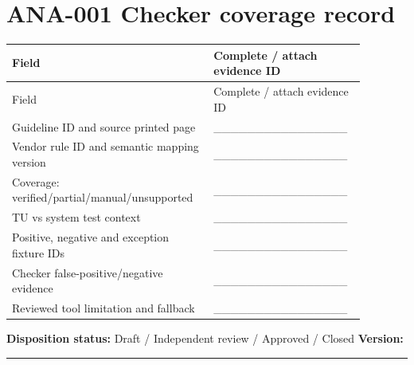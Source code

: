 \documentclass[10pt,letterpaper]{article}
\begin{document}
\section{ANA-001 Checker coverage record}
\small\setlength{\tabcolsep}{3pt}\renewcommand{\arraystretch}{1.15}
\begin{longtable}{p{0.52\linewidth}p{0.36\linewidth}}
\toprule
Field & Complete / attach evidence ID\\ \midrule
\endfirsthead
\toprule
Field & Complete / attach evidence ID\\ \midrule
\endhead
Guideline ID and source printed page & \_\_\_\_\_\_\_\_\_\_\_\_\_\_\_\_\\
Vendor rule ID and semantic mapping version & \_\_\_\_\_\_\_\_\_\_\_\_\_\_\_\_\\
Coverage: verified/partial/manual/unsupported & \_\_\_\_\_\_\_\_\_\_\_\_\_\_\_\_\\
TU vs system test context & \_\_\_\_\_\_\_\_\_\_\_\_\_\_\_\_\\
Positive, negative and exception fixture IDs & \_\_\_\_\_\_\_\_\_\_\_\_\_\_\_\_\\
Checker false-positive/negative evidence & \_\_\_\_\_\_\_\_\_\_\_\_\_\_\_\_\\
Reviewed tool limitation and fallback & \_\_\_\_\_\_\_\_\_\_\_\_\_\_\_\_\\
\bottomrule
\end{longtable}
\normalsize
\textbf{Disposition status:} Draft / Independent review / Approved / Closed \quad \textbf{Version:} \rule{1.4cm}{0.4pt}
\end{document}
